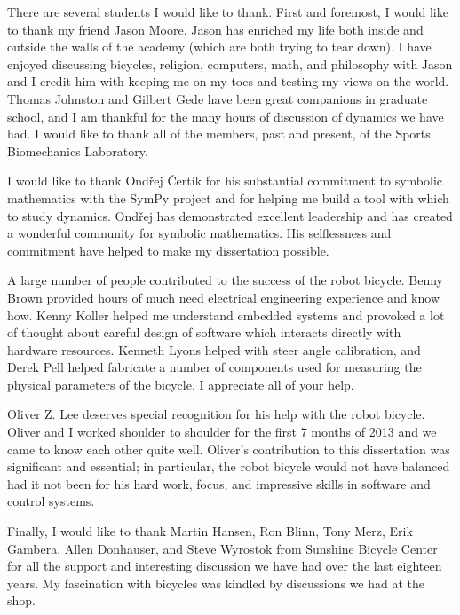 There are several students I would like to thank. First and foremost, I would
like to thank my friend Jason Moore. Jason has enriched my life both inside and
outside the walls of the academy (which are both trying to tear down). I have
enjoyed discussing bicycles, religion, computers, math, and philosophy with
Jason and I credit him with keeping me on my toes and testing my views on the
world. Thomas Johnston and Gilbert Gede have been great companions in graduate
school, and I am thankful for the many hours of discussion of dynamics we have
had. I would like to thank all of the members, past and present, of the Sports
Biomechanics Laboratory.

I would like to thank Ond\v{r}ej \v{C}ert\'{i}k for his substantial commitment
to symbolic mathematics with the SymPy project and for helping me build a tool
with which to study dynamics. Ond\v{r}ej has demonstrated excellent leadership
and has created a wonderful community for symbolic mathematics.  His
selflessness and commitment have helped to make my dissertation possible.

A large number of people contributed to the success of the robot bicycle. Benny
Brown provided hours of much need electrical engineering experience and know
how. Kenny Koller helped me understand embedded systems and provoked a lot of
thought about careful design of software which interacts directly with hardware
resources. Kenneth Lyons helped with steer angle calibration, and Derek Pell
helped fabricate a number of components used for measuring the physical
parameters of the bicycle. I appreciate all of your help.

Oliver Z. Lee deserves special recognition for his help with the robot bicycle.
Oliver and I worked shoulder to shoulder for the first 7 months of 2013 and we
came to know each other quite well. Oliver's contribution to this dissertation
was significant and essential; in particular, the robot bicycle would not have
balanced had it not been for his hard work, focus, and impressive skills in
software and control systems.

Finally, I would like to thank Martin Hansen, Ron Blinn, Tony Merz, Erik
Gambera, Allen Donhauser, and Steve Wyrostok from Sunshine Bicycle Center for
all the support and interesting discussion we have had over the last eighteen
years. My fascination with bicycles was kindled by discussions we had at the
shop.

